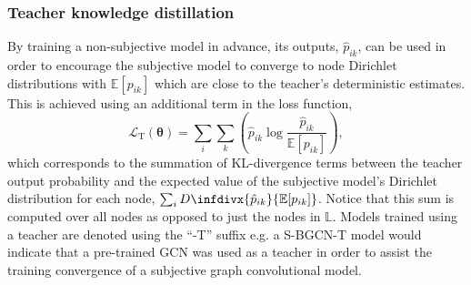 \documentclass[
twocolumn,
]{ceurart}
\newcommand{\infdiv}{D\infdivx}
\begin{document}
\subsubsection{Teacher knowledge distillation}
By training a non-subjective model in advance, its outputs, $\hat{p}_{ik}$, can be used in order to encourage the subjective model to converge to node Dirichlet distributions with $\mathbb{E}[p_{ik}]$ which are close to the teacher's deterministic estimates.
This is achieved using an additional term in the loss function,
\begin{equation}
    \mathcal{L}_{\text{T}}(\boldsymbol{\theta})=\sum_i\sum_k\left(\hat{p}_{ik}\log\frac{\hat{p}_{ik}}{\mathbb{E}[p_{ik}]}\right),
\end{equation}
which corresponds to the summation of KL-divergence terms between the teacher output probability and the expected value of the subjective model's Dirichlet distribution for each node, $\sum_i\infdiv{\hat{p}_{ik}}{\mathbb{E}[p_{ik}]}$.
Notice that this sum is computed over all nodes as opposed to just the nodes in $\mathbb{L}$.
Models trained using a teacher are denoted using the ``-T'' suffix e.g. a S-BGCN-T model would indicate that a pre-trained GCN was used as a teacher in order to assist the training convergence of a subjective graph convolutional model.
\end{document}
